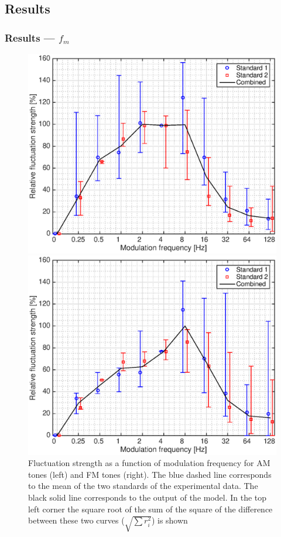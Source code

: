 \documentclass{beamer}
\begin{document}
\subsection{Results}
\begin{frame}
  \frametitle{Results --- $f_m$}
  \begin{figure}
    \centering
    \begin{minipage}{0.45\textwidth}
      \includegraphics[width=\textwidth]{garcia2015_am-fm}
    \end{minipage}
    \hfill
    \begin{minipage}{0.45\textwidth}
      \includegraphics[width=\textwidth]{garcia2015_fm-fm}
    \end{minipage}
    \caption{Fluctuation strength as a function of modulation frequency for
      AM tones (left) and FM tones (right). The blue dashed line corresponds to
      the mean of the two standards of the experimental data. The black solid
      line corresponds to the output of the model. In the top left corner the
      square root of the sum of the square of the difference between these two
      curves ($\sqrt{\sum r_i^2}$) is shown}
  \end{figure}
\end{frame}
\end{document}
